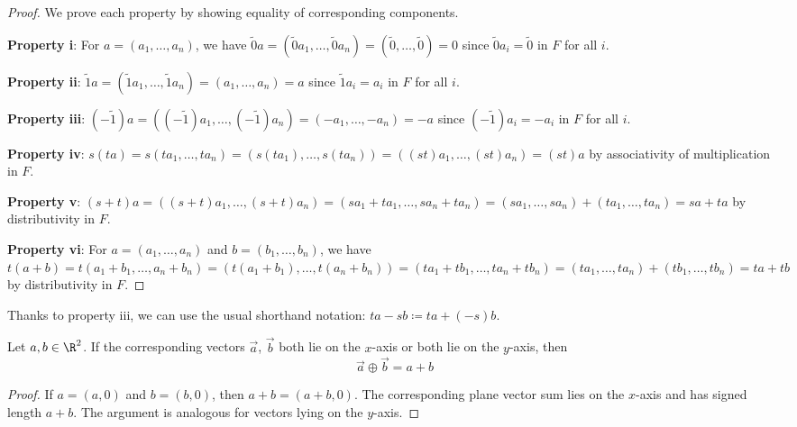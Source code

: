 \begin{proof}
    We prove each property by showing equality of corresponding components.
    
    \textbf{Property i}: For $a = (a_1, \ldots, a_n)$, we have $\tilde{0}a = (\tilde{0}a_1, \ldots, \tilde{0}a_n) = (\tilde{0}, \ldots, \tilde{0}) = 0$ since $\tilde{0}a_i = \tilde{0}$ in $F$ for all $i$.
    
    \textbf{Property ii}: $\tilde{1}a = (\tilde{1}a_1, \ldots, \tilde{1}a_n) = (a_1, \ldots, a_n) = a$ since $\tilde{1}a_i = a_i$ in $F$ for all $i$.
    
    \textbf{Property iii}: $(-\tilde{1})a = ((-\tilde{1})a_1, \ldots, (-\tilde{1})a_n) = (-a_1, \ldots, -a_n) = -a$ since $(-\tilde{1})a_i = -a_i$ in $F$ for all $i$.
    
    \textbf{Property iv}: $s(ta) = s(ta_1, \ldots, ta_n) = (s(ta_1), \ldots, s(ta_n)) = ((st)a_1, \ldots, (st)a_n) = (st)a$ by associativity of multiplication in $F$.
    
    \textbf{Property v}: $(s + t)a = ((s + t)a_1, \ldots, (s + t)a_n) = (sa_1 + ta_1, \ldots, sa_n + ta_n) = (sa_1, \ldots, sa_n) + (ta_1, \ldots, ta_n) = sa + ta$ by distributivity in $F$.
    
    \textbf{Property vi}: For $a = (a_1, \ldots, a_n)$ and $b = (b_1, \ldots, b_n)$, we have $t(a + b) = t(a_1 + b_1, \ldots, a_n + b_n) = (t(a_1 + b_1), \ldots, t(a_n + b_n)) = (ta_1 + tb_1, \ldots, ta_n + tb_n) = (ta_1, \ldots, ta_n) + (tb_1, \ldots, tb_n) = ta + tb$ by distributivity in $F$.
\end{proof}

\begin{note}
    Thanks to property iii, we can use the usual shorthand notation: $ta - sb \coloneqq ta + (-s)b$.
\end{note}



\begin{lemma}\label{lem:axis-addition}
    Let $a, b \in \R^2$. If the corresponding vectors $\vec{a}$, $\vec{b}$ both lie on the $x$-axis or both lie on the $y$-axis, then
    \[
    \vec{a} \oplus \vec{b} = a + b
    \]
\end{lemma}

\begin{proof}
    If $a = (a, 0)$ and $b = (b, 0)$, then $a + b = (a + b, 0)$. The corresponding plane vector sum lies on the $x$-axis and has signed length $a + b$. The argument is analogous for vectors lying on the $y$-axis.
\end{proof}

